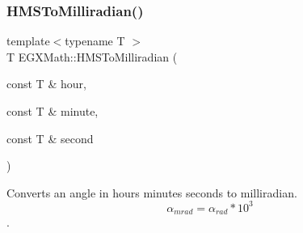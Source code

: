 \subsubsection{\texorpdfstring{H\+M\+S\+To\+Milliradian()}{HMSToMilliradian()}}
{\footnotesize\ttfamily template$<$typename T $>$ \\
T E\+G\+X\+Math\+::\+H\+M\+S\+To\+Milliradian (\begin{DoxyParamCaption}\item[{const T \&}]{hour,  }\item[{const T \&}]{minute,  }\item[{const T \&}]{second }\end{DoxyParamCaption})}



Converts an angle in hours minutes seconds to milliradian. \[\alpha_{mrad}=\alpha_{rad}*10^3\]. 

